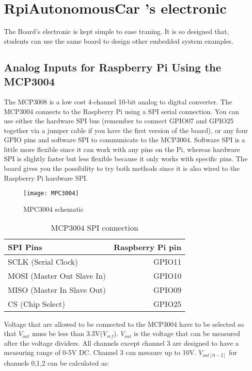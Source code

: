 \documentclass[
12pt, %
a4paper, %
oneside, %
headinclude,footinclude, %
BCOR5mm, %
]{scrartcl}
\begin{document}
\section{RpiAutonomousCar 's electronic}
The Board's electronic is kept simple to ease traning. It is so designed that, students can use the same board to design other embedded system examples.
\subsection{Analog Inputs for Raspberry Pi Using the MCP3004}
The MCP3008 is a low cost 4-channel 10-bit analog to digital converter. The MCP3004 connects to the Raspberry Pi using a SPI serial connection. You can use either the hardware SPI bus (remember to connect GPIO07 and GPIO25 together via a jumper cable if you have the first version of the board), or any four GPIO pins and software SPI to communicate to the MCP3004. Software SPI is a little more flexible since it can work with any pins on the Pi, whereas hardware SPI is slightly faster but less flexible because it only works with specific pins. The board gives you the possibility to try both methods since it is also wired to the Raspberry Pi hardware SPI.

\begin{figure}[h]
\centering
\texttt{[image: MPC3004]} 
\caption[MPC3004 schematic]{MPC3004 schematic}
\label{fig:MPC3004}
\end{figure}

\begin{table}[H]
\caption{MCP3004 SPI connection}
\centering
\begin{tabular}{lr}
\toprule
SPI Pins & Raspberry Pi pin \\
\midrule
SCLK (Serial Clock)        & GPIO11 \\
MOSI (Master Out Slave In) & GPIO10 \\
MISO (Master In Slave Out) & GPIO09 \\
CS   (Chip Select)         & GPIO25 \\
\bottomrule
\end{tabular}
\label{tab:label}
\end{table}
Voltage that are allowed to be connected to the MCP3004 have to be selected so that \(V_{out}\) muss be less than 3.3V(\(V_{ref}\)). \(V_{out}\) is the voltage that can be measured after the voltage dividers. All channels except channel 3 are designed to have a measuring range of 0-5V DC. Channel 3 can mesaure up to 10V.
\(V_{out[0-2]}\) for channels 0,1,2 can be calculated as:
\end{document}
